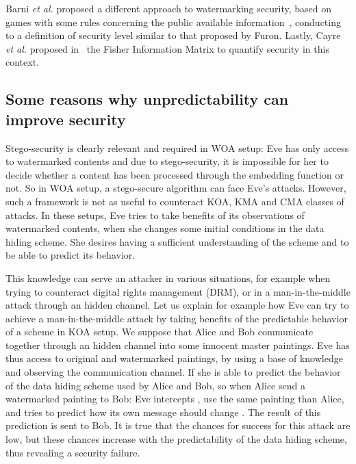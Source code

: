 \documentclass{llncs}
\begin{document}
Barni \emph{et al.} proposed a different approach to watermarking security, based on games with some rules concerning the public available information~\cite{BarniBF03}, conducting to a definition of security level similar to that proposed by Furon. Lastly, Cayre \emph{et al.} proposed in~\cite{Cayre2005} the Fisher Information Matrix to quantify security in this context.


\subsection{Some reasons why unpredictability can improve security}

Stego-security is clearly relevant and required in WOA setup: Eve has only access to watermarked contents and due to stego-security, it is impossible for her to decide whether a content has been processed through the embedding function or not. So in WOA setup, a stego-secure algorithm can face Eve's attacks. However, such a framework is not as useful to counteract KOA, KMA and CMA classes of attacks. In these setups, Eve tries to take benefits of its observations of watermarked contents, when she changes some  initial conditions in the data hiding scheme. She desires having a sufficient understanding of the scheme and to be able to predict its behavior.


This knowledge can serve an attacker in various situations, for example when trying to counteract digital rights management (DRM), or in a man-in-the-middle attack through an hidden channel. Let us explain for example how Eve can try to achieve a man-in-the-middle attack by taking benefits of the predictable behavior of a scheme in KOA setup. We suppose that Alice and Bob communicate together through an hidden channel into some innocent master paintings. Eve has thus access to original and watermarked paintings, by using a base of knowledge and observing the communication channel. If she is able to predict the behavior of the data hiding scheme used by Alice and Bob, so when Alice send a watermarked painting  to Bob: Eve intercepts , use the same painting  than Alice, and tries to predict how its own message should change . The result of this prediction is sent to Bob. It is true that the chances for success for this attack are low, but these chances increase with the predictability of the data hiding scheme, thus revealing a security failure.
\end{document}
